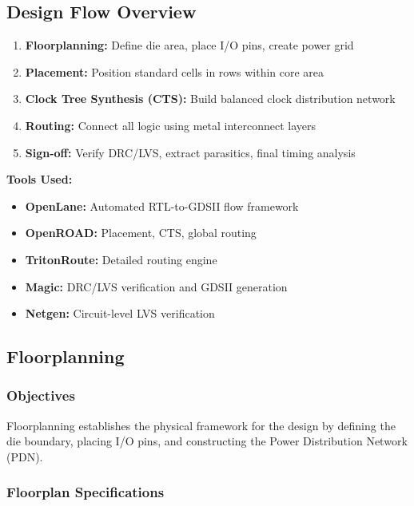 \documentclass[12pt,a4paper]{article}
\begin{document}
\subsection{Design Flow Overview}

\begin{tcolorbox}[colback=blue!5,colframe=blue!75!black,title=OpenLane Physical Design Flow]
\begin{enumerate}[leftmargin=*]
    \item \textbf{Floorplanning:} Define die area, place I/O pins, create power grid
    \item \textbf{Placement:} Position standard cells in rows within core area
    \item \textbf{Clock Tree Synthesis (CTS):} Build balanced clock distribution network
    \item \textbf{Routing:} Connect all logic using metal interconnect layers
    \item \textbf{Sign-off:} Verify DRC/LVS, extract parasitics, final timing analysis
\end{enumerate}
\end{tcolorbox}

\textbf{Tools Used:}
\begin{itemize}
    \item \textbf{OpenLane:} Automated RTL-to-GDSII flow framework
    \item \textbf{OpenROAD:} Placement, CTS, global routing
    \item \textbf{TritonRoute:} Detailed routing engine
    \item \textbf{Magic:} DRC/LVS verification and GDSII generation
    \item \textbf{Netgen:} Circuit-level LVS verification
\end{itemize}

\newpage

\subsection{Floorplanning}

\subsubsection{Objectives}
Floorplanning establishes the physical framework for the design by defining the die boundary, placing I/O pins, and constructing the Power Distribution Network (PDN).

\subsubsection{Floorplan Specifications}
\end{document}
